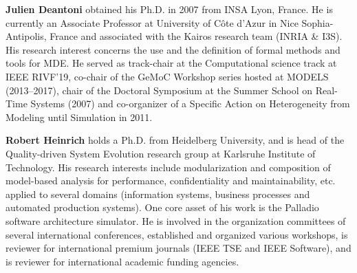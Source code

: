 \noindent
\textbf{Julien Deantoni} obtained his Ph.D. in 2007 from INSA Lyon, France. He is currently an Associate Professor at University of Côte d'Azur in Nice Sophia-Antipolis, France and associated with the Kairos research team (INRIA \& I3S).
His research interest concerns the use and the definition of formal methods and tools for MDE.
He served as track-chair at the Computational science track at IEEE RIVF'19, co-chair of the GeMoC Workshop series hosted at MODELS (2013--2017), chair of the Doctoral Symposium at the Summer School on Real-Time Systems (2007) and co-organizer of a Specific Action on Heterogeneity from Modeling until Simulation in 2011.

\noindent
\textbf{Robert Heinrich} holds a Ph.D. from Heidelberg University, and is head of the Quality-driven System Evolution research group at Karlsruhe Institute of Technology. His research interests include modularization
and composition of model-based analysis for performance, confidentiality and maintainability, etc. applied to several domains (information systems, business processes and automated production systems). One core asset of his work is the Palladio software architecture simulator. He is involved in the organization committees of several international conferences, established and organized various workshops, is reviewer for international premium journals (IEEE TSE and IEEE Software), and is reviewer for international academic funding agencies.



